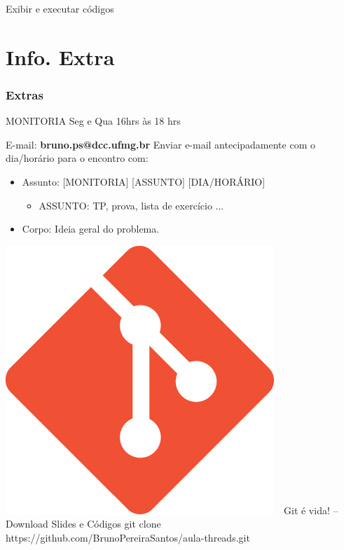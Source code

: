 \documentclass[10pt, xcolor=x11names]{beamer}
\newcommand\Fontvi{\fontsize{8}{7.2}\selectfont}
\begin{document}

\begin{frame}
	\centering
 	\Huge
	Exibir e executar códigos
\end{frame}


\section{Info. Extra} %

\begin{frame}\frametitle{Extras}
	\begin{exampleblock}{MONITORIA}
		Seg e Qua 16hrs às 18 hrs
	\end{exampleblock}
	
	\begin{alertblock}{E-mail: \textbf{bruno.ps@dcc.ufmg.br}}
		Enviar e-mail antecipadamente com o dia/horário para o encontro com:
		\begin{itemize}
		 	\item Assunto: [MONITORIA] [ASSUNTO] [DIA/HORÁRIO]
		 		\begin{itemize}
		 			\item ASSUNTO: TP, prova, lista de exercício ...
		 		\end{itemize}
		 	\item Corpo: Ideia geral do problema.
		\end{itemize} 
	\end{alertblock}

	\begin{block}{\includegraphics[width=0.035 \linewidth]{img/git.png}~~Git é vida! -- Download Slides e Códigos}
		git clone https://github.com/BrunoPereiraSantos/aula-threads.git
	\end{block}

\end{frame}


\begin{frame}
	\Fontvi
	\nocite{*}
	
	
\end{frame}
\end{document}
